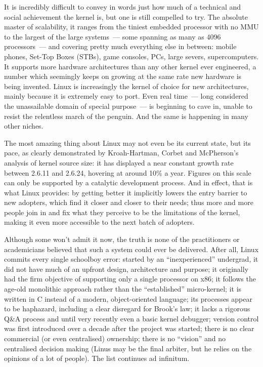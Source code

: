 \documentclass{memoir}
\begin{document}
It is incredibly difficult to convey in words just how much of a
technical and social achievement the kernel is, but one is still
compelled to try. The absolute master of scalability, it ranges from
the tiniest embedded processor with no MMU to the largest of the large
systems~--- some spanning as many as 4096 processors~--- and
covering pretty much everything else in between: mobile phones,
Set-Top Boxes (STBs), game consoles, PCs, large severs,
supercomputers. It supports more hardware architectures than any other
kernel ever engineered, a number which seemingly keeps on growing at
the same rate new hardware is being invented. Linux is increasingly
the kernel of choice for new architectures, mainly because it is
extremely easy to port. Even real time~--- long considered the
unassailable domain of special purpose~--- is beginning to cave in,
unable to resist the relentless march of the penguin. And the same is
happening in many other niches.

The most amazing thing about Linux may not even be its current state,
but its pace, as clearly demonstrated by Kroah-Hartman, Corbet and
McPherson's analysis of kernel source size: it has displayed a near
constant growth rate between 2.6.11 and 2.6.24, hovering at around
10\% a year. Figures on this scale can only be supported by a
catalytic development process. And in effect, that is what Linux
provides: by getting better it implicitly lowers the entry barrier to
new adopters, which find it closer and closer to their needs; thus
more and more people join in and fix what they perceive to be the
limitations of the kernel, making it even more accessible to the next
batch of adopters.

Although some won't admit it now, the truth is none of the
practitioners or academicians believed that such a system could ever
be delivered. After all, Linux commits every single schoolboy error:
started by an ``inexperienced'' undergrad, it did not have much of an
upfront design, architecture and purpose; it originally had the firm
objective of supporting only a single processor on x86; it follows the
age-old monolithic approach rather than the ``established''
micro-kernel; it is written in C instead of a modern, object-oriented
language; its processes appear to be haphazard, including a clear
disregard for Brook's law; it lacks a rigorous Q\&A process and until
very recently even a basic kernel debugger; version control was first
introduced over a decade after the project was started; there is no
clear commercial (or even centralised) ownership; there is no
``vision'' and no centralised decision making (Linus may be the final
arbiter, but he relies on the opinions of a lot of people). The list
continues ad infinitum.
\end{document}
